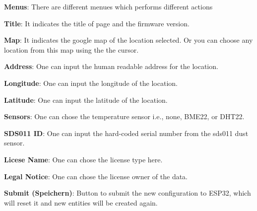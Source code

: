 \begin{DoxyEnumerate}
\item {\bfseries{Menus}}\+: There are different menues which performs different actions
\item {\bfseries{Title}}\+: It indicates the title of page and the firmware version.
\item {\bfseries{Map}}\+: It indicates the google map of the location selected. Or you can choose any location from this map using the the cursor.
\item {\bfseries{Address}}\+: One can input the human readable address for the location.
\item {\bfseries{Longitude}}\+: One can input the longitude of the location.
\item {\bfseries{Latitude}}\+: One can input the latitude of the location.
\item {\bfseries{Sensors}}\+: One can chose the temperature sensor i.\+e., none, B\+M\+E22, or D\+H\+T22.
\item {\bfseries{S\+D\+S011 ID}}\+: One can input the hard-\/coded serial number from the sds011 dust sensor.
\item {\bfseries{Licese Name}}\+: One can chose the license type here.
\item {\bfseries{Legal Notice}}\+: One can chose the license owner of the data.
\item {\bfseries{Submit (Speichern)}}\+: Button to submit the new configuration to E\+S\+P32, which will reset it and new entities will be created again.
\end{DoxyEnumerate}

